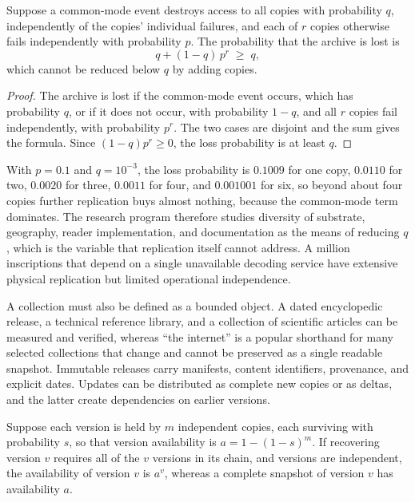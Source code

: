 \begin{proposition}\label{prop:common}
Suppose a common-mode event destroys access to all copies with probability $q$, independently of the copies' individual failures, and each of $r$ copies otherwise fails independently with probability $p$. The probability that the archive is lost is
\[
q+(1-q)\,p^{r}\;\ge\;q ,
\]
which cannot be reduced below $q$ by adding copies.
\end{proposition}

\begin{proof}
The archive is lost if the common-mode event occurs, which has probability $q$, or if it does not occur, with probability $1-q$, and all $r$ copies fail independently, with probability $p^r$. The two cases are disjoint and the sum gives the formula. Since $(1-q)p^{r}\ge0$, the loss probability is at least $q$.
\end{proof}

With $p=0.1$ and $q=10^{-3}$, the loss probability is $0.1009$ for one copy, $0.0110$ for two, $0.0020$ for three, $0.0011$ for four, and $0.001001$ for six, so beyond about four copies further replication buys almost nothing, because the common-mode term dominates. The research program therefore studies diversity of substrate, geography, reader implementation, and documentation as the means of reducing $q$, which is the variable that replication itself cannot address. A million inscriptions that depend on a single unavailable decoding service have extensive physical replication but limited operational independence.

A collection must also be defined as a bounded object. A dated encyclopedic release, a technical reference library, and a collection of scientific articles can be measured and verified, whereas ``the internet'' is a popular shorthand for many selected collections that change and cannot be preserved as a single readable snapshot. Immutable releases carry manifests, content identifiers, provenance, and explicit dates. Updates can be distributed as complete new copies or as deltas, and the latter create dependencies on earlier versions.

\begin{proposition}\label{prop:delta}
Suppose each version is held by $m$ independent copies, each surviving with probability $s$, so that version availability is $a=1-(1-s)^{m}$. If recovering version $v$ requires all of the $v$ versions in its chain, and versions are independent, the availability of version $v$ is $a^{v}$, whereas a complete snapshot of version $v$ has availability $a$.
\end{proposition}

